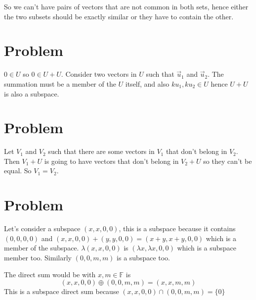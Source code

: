 \documentclass[letter]{article}
\begin{document}
So we can't have pairs of vectors that are not common in both sets, hence either the two subsets should be exactly similar or they have to contain the other. 

\section{Problem}
$0 \in U$ so $0 \in U+U$. 
Consider two vectors in $U$ such that $\vec{u}_1$ and $\vec{u}_2$. The summation must be a member of the $U$ itself, and also $k u_1, ku_2 \in U$ hence $U+U$ is also a subspace.


\section{Problem} 
Let $V_1$ and $V_2$ such that there are some vectors in $V_1$ that don't belong in $V_2$. Then $V_1 + U$ is going to have vectors that don't belong in $V_2 + U$ so they can't be equal. So $V_1=V_2$. 

\section{Problem} 
Let's consider a subspace $(x,x,0,0)$, this is a subspace because it contains $(0,0,0,0)$ and $(x,x,0,0)+(y,y,0,0) = (x+y,x+y,0,0)$ which is a member of the subspace. $\lambda(x,x,0,0)$ is $(\lambda x, \lambda x, 0, 0)$ which is a subspace member too. Similarly $(0,0,m,m)$ is a subspace too. 

The direct sum would be with $x,m \in \mathbb{F}$ is
\[
	(x,x,0,0) \oplus (0,0,m,m) = (x,x,m,m)
\] 
This is a subspace direct sum because $(x,x,0,0) \cap (0,0,m,m) = \{0\} $ 
\end{document}
